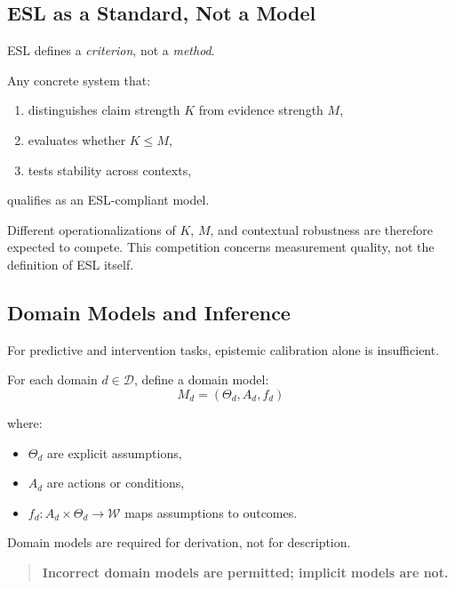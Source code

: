 \subsection{ESL as a Standard, Not a Model}

ESL defines a \emph{criterion}, not a \emph{method}.

Any concrete system that:
\begin{enumerate}
    \item distinguishes claim strength $K$ from evidence strength $M$,
    \item evaluates whether $K \le M$,
    \item tests stability across contexts,
\end{enumerate}
qualifies as an ESL-compliant model.

Different operationalizations of $K$, $M$, and contextual robustness are therefore expected to compete. This competition concerns measurement quality, not the definition of ESL itself.


\subsection{Domain Models and Inference}

For predictive and intervention tasks, epistemic calibration alone is insufficient.

For each domain $d \in \mathcal{D}$, define a domain model:
\[
M_d = (\Theta_d, A_d, f_d)
\]

where:
\begin{itemize}
    \item $\Theta_d$ are explicit assumptions,
    \item $A_d$ are actions or conditions,
    \item $f_d : A_d \times \Theta_d \rightarrow \mathcal{W}$ maps assumptions to outcomes.
\end{itemize}

Domain models are required for derivation, not for description.

\begin{quote}
\textbf{Incorrect domain models are permitted; implicit models are not.}
\end{quote}


